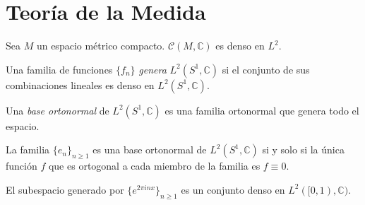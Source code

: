 \section{Teoría de la Medida}

\begin{teorema}
	Sea $M$ un espacio métrico compacto. $\mathcal{C}(M,\mathbb{C})$ es denso en $L^2$.
\end{teorema}

\cite{upennpdfL2}

\begin{definicion}
	Una familia de funciones $\{f_n\}$ \textit{genera} $L^2(S^1,\mathbb{C})$ si el conjunto de sus combinaciones lineales es denso en $L^2(S^1,\mathbb{C})$.
\end{definicion}

\begin{definicion}
	Una \textit{base ortonormal} de $L^2(S^1,\mathbb{C})$ es una familia ortonormal que genera todo el espacio.
\end{definicion}

\begin{lema}
	La familia $\{e_n\}_{n \geq 1}$ es una base ortonormal de $L^2(S^1,\mathbb{C})$ si y solo si la única función $f$ que es ortogonal a cada miembro de la familia es $f \equiv 0$.
\end{lema}

\begin{teorema}
	El subespacio generado por $\{e^{2\pi inx}\}_{n \geq 1}$ es un conjunto denso en $L^2([0,1),\mathbb{C})$.
\end{teorema}

